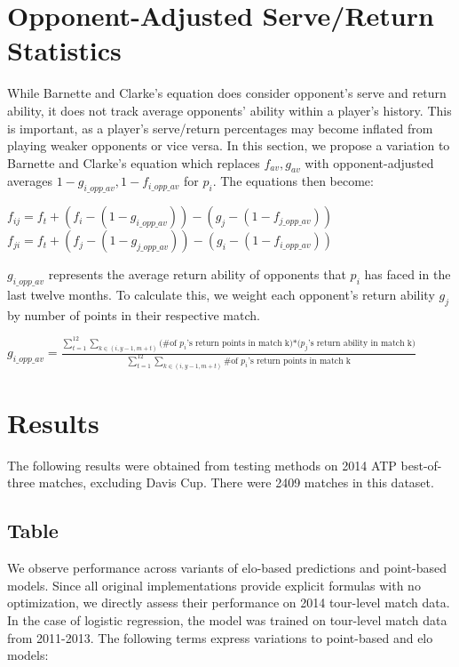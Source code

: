 \documentclass[chapterprefix=false]{report}
\begin{document}

\section{Opponent-Adjusted Serve/Return Statistics}

While Barnette and Clarke's equation does consider opponent's serve and return ability, it does not track average opponents' ability within a player's history. This is important, as a player's serve/return percentages may become inflated from playing weaker opponents or vice versa. In this section, we propose a variation to Barnette and Clarke's equation which replaces $f_{av},g_{av}$ with opponent-adjusted averages $1-g_{i\_opp\_av},1-f_{i\_opp\_av}$ for $p_i$. The equations then become:

\begin{center}
$f_{ij} = f_t + (f_i-(1-g_{i\_opp\_av}))-(g_j-(1-f_{j\_opp\_av}))$
$f_{ji} = f_t + (f_j-(1-g_{j\_opp\_av}))-(g_i-(1-f_{i\_opp\_av}))$
\end{center}

$g_{i\_opp\_av}$ represents the average return ability of opponents that $p_i$ has faced in the last twelve months. To calculate this, we weight each opponent's return ability $g_j$ by number of points in their respective match.

\large{$g_{i\_opp\_av} = \frac{\sum_{t=1}^{12}\sum_{k \in (i,y-1,m+t)}{\text{(\# of $p_i$'s return points in match k)*($p_j$'s return ability in match k)}}}{\sum_{t=1}^{12}\sum_{k \in (i,y-1,m+t)}\text{\# of $p_i$'s return points in match k}}$}


\section{Results}
The following results were obtained from testing methods on 2014 ATP best-of-three matches, excluding Davis Cup. There were 2409 matches in this dataset. 

\subsection{Table}
We observe performance across variants of elo-based predictions and point-based models. Since all original implementations provide explicit formulas with no optimization, we directly assess their performance on 2014 tour-level match data. In the case of logistic regression, the model was trained on tour-level match data from 2011-2013. The following terms express variations to point-based and elo models:
\end{document}

